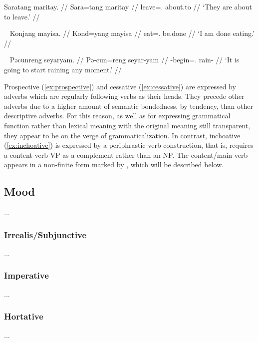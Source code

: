 \ex\label{ex:prospective}\begingl
	\gla Saratang maritay. //
	\glb Sara=tang maritay //
	\glc leave=\TplM{}.\Aarg{} about.to //
	\glft `They are about to leave.' //
\endgl\xe

\ex~\label{ex:cessative}\begingl
	\gla Konjang mayisa. //
	\glb Kond=yang mayisa //
	\glc eat=\Fsg.\Aarg{} be.done //
	\glft `I am done eating.' //
\endgl\xe

\ex~\label{ex:inchoative}\begingl
	\gla Pəcunreng seyaryam. //
	\glb Pə-cun=reng seyar-yam //
	\glc \NFut{}-begin=\TsgI{}.\Aarg{} rain-\Ptcp{} //
	\glft `It is going to start raining any moment.' //
\endgl\xe

Prospective  (\ref{ex:prospective}) and cessative 
 (\ref{ex:cessative}) are expressed by adverbs which are 
regularly following verbs as their heads. They precede other adverbs due to a 
higher amount of semantic bondedness, by tendency, than other descriptive 
adverbs. For this reason, as well as for expressing grammatical function rather 
than lexical meaning with the original meaning still transparent, they appear to 
be on the verge of grammaticalization. In contrast, inchoative 
 (\ref{ex:inchoative}) is expressed by a periphrastic verb 
construction, that is,  requires a content-verb VP as a 
complement rather than an NP. The content/main verb appears in a non-finite 
form marked by , which will be described below.

\subsection{Mood}

...

\subsubsection{Irrealis/Subjunctive}
...


\subsubsection{Imperative}
...


\subsubsection{Hortative}
...

